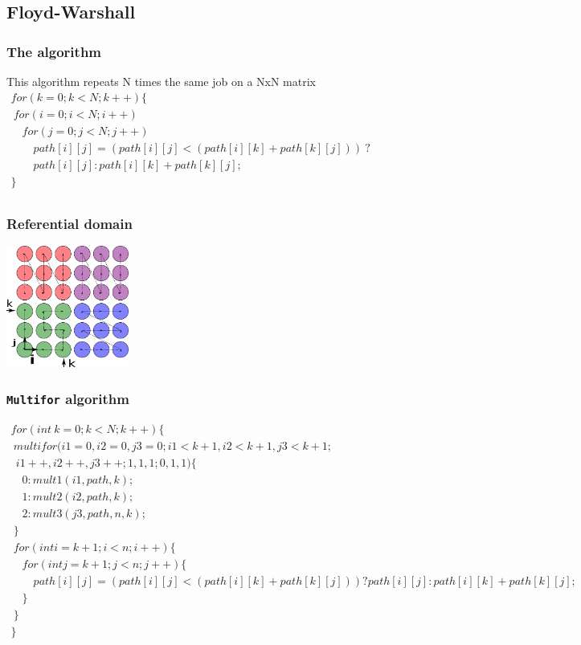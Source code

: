 \documentclass{beamer}
\begin{document}
\subsection{Floyd-Warshall}

\begin{frame}
\frametitle{The algorithm}
This algorithm repeats N times the same job on a NxN matrix\newline \\
{$\begin{array}{l}
for (k = 0; k < N; k++)\{ \\
~for(i = 0; i < N; i++) \\
\quad{}for (j = 0; j < N; j++) \\
\qquad{}path[i][j] = (path[i][j] < (path[i][k] + path[k][j]))~? \\
\qquad{}path[i][j] : path[i][k] + path[k][j]; \\
\} \\
\end{array}$
}

\end{frame}

\begin{frame}
\frametitle{Referential domain}

\centering
\includegraphics[height=4cm]{pictures/floyd-warshall-domain}

\end{frame}


\begin{frame}
\frametitle{\texttt{Multifor} algorithm}
\scriptsize{$\begin{array}{l}
for(int~k=0; k< N; k++)\{ \\
~multifor(i1=0,i2=0,j3=0; i1<k+1, i2<k+1, j3<k+1;\\
~~i1++,i2++,j3++; 1,1,1; 0,1,1)\{ \\
\quad{}0: mult1(i1, path, k); \\
\quad{}1: mult2(i2,path,k); \\
\quad{}2: mult3(j3,path,n,k); \\
~\} \\
~for(int i=k+1; i<n;i++)\{ \\
\quad{}for(int j=k+1;j<n;j++)\{ \\
\qquad{}path[i][j] = (path[i][j] < (path[i][k] + path[k][j])) ? path[i][j] : path[i][k] + path[k][j]; \\
\quad{}\} \\
~\} \\
\}
\end{array}$
}
\end{frame}
\end{document}
